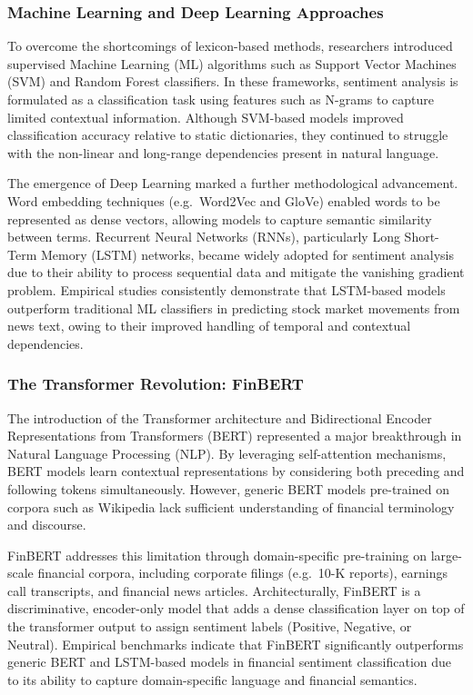\documentclass[singlespace]{ucetd}
\begin{document}
\subsubsection{Machine Learning and Deep Learning Approaches}

To overcome the shortcomings of lexicon-based methods, researchers introduced supervised Machine Learning (ML) algorithms such as Support Vector Machines (SVM) and Random Forest classifiers. In these frameworks, sentiment analysis is formulated as a classification task using features such as N-grams to capture limited contextual information. Although SVM-based models improved classification accuracy relative to static dictionaries, they continued to struggle with the non-linear and long-range dependencies present in natural language.

The emergence of Deep Learning marked a further methodological advancement. Word embedding techniques (e.g.\ Word2Vec and GloVe) enabled words to be represented as dense vectors, allowing models to capture semantic similarity between terms. Recurrent Neural Networks (RNNs), particularly Long Short-Term Memory (LSTM) networks, became widely adopted for sentiment analysis due to their ability to process sequential data and mitigate the vanishing gradient problem. Empirical studies consistently demonstrate that LSTM-based models outperform traditional ML classifiers in predicting stock market movements from news text, owing to their improved handling of temporal and contextual dependencies.

\subsubsection{The Transformer Revolution: FinBERT}

The introduction of the Transformer architecture and Bidirectional Encoder Representations from Transformers (BERT) represented a major breakthrough in Natural Language Processing (NLP). By leveraging self-attention mechanisms, BERT models learn contextual representations by considering both preceding and following tokens simultaneously. However, generic BERT models pre-trained on corpora such as Wikipedia lack sufficient understanding of financial terminology and discourse.

FinBERT addresses this limitation through domain-specific pre-training on large-scale financial corpora, including corporate filings (e.g.\ 10-K reports), earnings call transcripts, and financial news articles. Architecturally, FinBERT is a discriminative, encoder-only model that adds a dense classification layer on top of the transformer output to assign sentiment labels (Positive, Negative, or Neutral). Empirical benchmarks indicate that FinBERT significantly outperforms generic BERT and LSTM-based models in financial sentiment classification due to its ability to capture domain-specific language and financial semantics.
\end{document}
